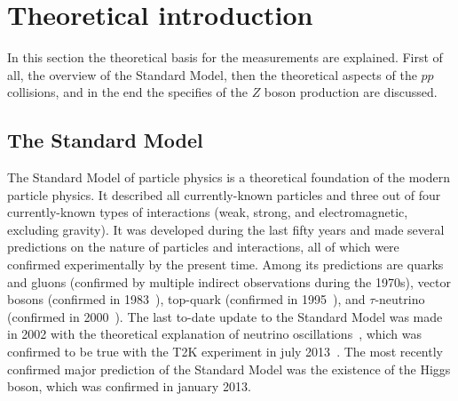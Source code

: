 \chapter{Theoretical introduction}
\label{sec:Theory}

In this section the theoretical basis for the measurements are explained. First of all, the overview of the Standard Model, then the theoretical aspects of the $pp$ collisions, and in the end the specifies of the $Z$ boson production are discussed.

\section{The Standard Model}
\label{sec:theory_SM}

The Standard Model of particle physics is a theoretical foundation of the modern particle physics. It described all currently-known particles and three out of four currently-known types of interactions (weak, strong, and electromagnetic, excluding gravity). It was developed during the last fifty years and made several predictions on the nature of particles and interactions, all of which were confirmed experimentally by the present time. Among its predictions are quarks and gluons (confirmed by multiple indirect observations during the 1970s), vector bosons (confirmed in 1983~\cite{lib:theory_qed_wz}), top-quark (confirmed in 1995~\cite{lib:theory_qcd_top}), and $\tau$-neutrino (confirmed in 2000~\cite{lib:theory_qed_tau_nu}). The last to-date update to the Standard Model was made in 2002 with the theoretical explanation of neutrino oscillations~\cite{lib:theory_qed_nu_oscill_th}, which was confirmed to be true with the T2K experiment in july 2013~\cite{lib:theory_qed_nu_oscill_ex}. The most recently confirmed major prediction of the Standard Model was the existence of the Higgs boson, which was confirmed in january 2013.

